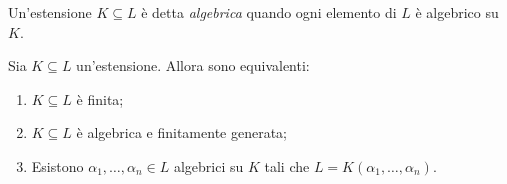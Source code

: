 %
%
%
%

\begin{defi}
Un'estensione $K \subseteq L$ è detta {\em algebrica} quando ogni elemento di $L$ è algebrico su $K$.
\end{defi}

\begin{prop}\label{prop:EstensioneFinitaEquivalenti}
Sia $K \subseteq L$ un'estensione. Allora sono equivalenti:
\begin{enumerate}
\item $K \subseteq L$ è finita;
\item $K \subseteq L$ è algebrica e finitamente generata;
\item Esistono $\alpha_1, \dots{}, \alpha_n \in L$ algebrici su $K$ tali che $L = K(\alpha_1,\dots,\alpha_n)$.
\end{enumerate}
\end{prop}

